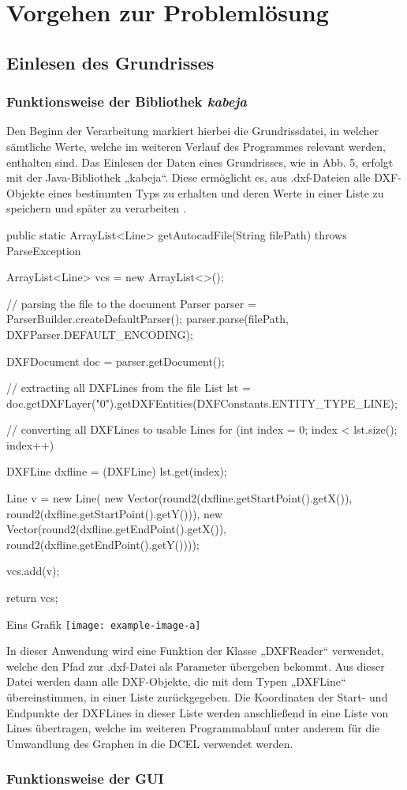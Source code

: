 \chapter{Vorgehen zur Problemlösung}
\section{Einlesen des Grundrisses}
\subsection{Funktionsweise der Bibliothek \textit{kabeja}}
Den Beginn der Verarbeitung markiert hierbei die Grundrissdatei, in welcher sämtliche Werte, welche im weiteren Verlauf des Programmes relevant werden, enthalten sind.
Das Einlesen der Daten eines Grundrisses, wie in Abb. 5, erfolgt mit der Java-Bibliothek „kabeja“. 
Diese ermöglicht es, aus .dxf-Dateien alle DXF-Objekte eines bestimmten Typs zu erhalten und deren Werte in einer Liste zu speichern und später zu verarbeiten \cite{kabeja}.
\begin{code}
public static ArrayList<Line> getAutocadFile(String filePath) throws ParseException {
	ArrayList<Line> vcs = new ArrayList<>();
	
	// parsing the file to the document
	Parser parser = ParserBuilder.createDefaultParser();
	parser.parse(filePath, DXFParser.DEFAULT_ENCODING);
	
	DXFDocument doc = parser.getDocument();
	
	// extracting all DXFLines from the file
	List lst = doc.getDXFLayer("0").getDXFEntities(DXFConstants.ENTITY_TYPE_LINE);
	
	// converting all DXFLines to usable Lines
	for (int index = 0; index < lst.size(); index++) {
		DXFLine dxfline = (DXFLine) lst.get(index);
		
		Line v = new Line(
		new Vector(round2(dxfline.getStartPoint().getX()), round2(dxfline.getStartPoint().getY())),
		new Vector(round2(dxfline.getEndPoint().getX()), round2(dxfline.getEndPoint().getY())));
		
		vcs.add(v);
	}
	
	return vcs;
}
\end{code}
\begin{Bild}{Eins Grafik}
	\texttt{[image: example-image-a]}
\end{Bild}
In dieser Anwendung wird eine Funktion der Klasse „DXFReader“ verwendet, welche den Pfad zur .dxf-Datei als Parameter übergeben bekommt. 
Aus dieser Datei werden dann alle DXF-Objekte, die mit dem Typen „DXFLine“ übereinstimmen, in einer Liste zurückgegeben. 
Die Koordinaten der Start- und Endpunkte der DXFLines  in dieser Liste werden anschließend in eine Liste von Lines übertragen, welche im weiteren Programmablauf unter anderem für die Umwandlung des Graphen in die DCEL verwendet werden.
\subsection{Funktionsweise der GUI}
